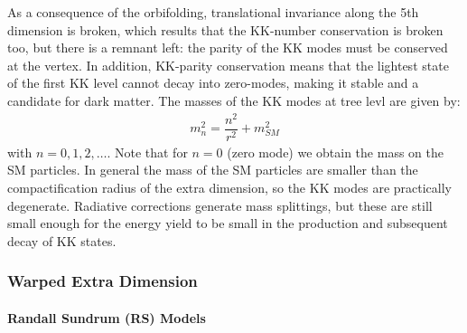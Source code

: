 As a consequence of the orbifolding, translational invariance along the 5th dimension is broken, which results that the KK-number conservation is broken too, but there is a remnant left: the parity
of the KK modes must be conserved at	 the vertex. In addition, KK-parity conservation means that the lightest state of
the first KK level cannot decay into zero-modes, making it
stable and a candidate for dark matter.
The masses of the KK modes at tree levl are given by:
\begin{eqnarray}
m_{n}^{2} = \dfrac{n^{2}}{r^{2}}+ m_{SM}^{2}
\end{eqnarray}
with $n=0,1,2,\dots$. Note that for $n=0$ (zero mode) we obtain the mass on the SM particles. In general the mass of the SM particles are smaller than the compactification radius of the extra dimension, so the KK modes are practically degenerate. Radiative corrections generate mass splittings, but these are still
small enough for the energy yield to be small in the production and subsequent decay of KK states.

\subsubsection{Warped Extra Dimension}

\paragraph{Randall Sundrum (RS) Models}

